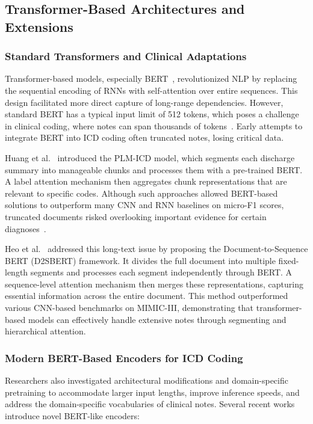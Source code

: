 \subsection{Transformer-Based Architectures and Extensions}\label{sec:p1:transformers}

\subsubsection{Standard Transformers and Clinical Adaptations}

Transformer-based models, especially BERT~\citep{devlin2019bert}, revolutionized NLP by replacing the sequential encoding of RNNs with self-attention over entire sequences. This design facilitated more direct capture of long-range dependencies. However, standard BERT has a typical input limit of 512 tokens, which poses a challenge in clinical coding, where notes can span thousands of tokens~\citep{gao2021limitations}. Early attempts to integrate BERT into ICD coding often truncated notes, losing critical data. 

Huang et al.~\citep{huang2022plm} introduced the PLM-ICD model, which segments each discharge summary into manageable chunks and processes them with a pre-trained BERT. A label attention mechanism then aggregates chunk representations that are relevant to specific codes. Although such approaches allowed BERT-based solutions to outperform many CNN and RNN baselines on micro-F1 scores, truncated documents risked overlooking important evidence for certain diagnoses~\citep{dong2022automated}.

Heo et al.~\citep{heo2022medical} addressed this long-text issue by proposing the Document-to-Sequence BERT (D2SBERT) framework. It divides the full document into multiple fixed-length segments and processes each segment independently through BERT. A sequence-level attention mechanism then merges these representations, capturing essential information across the entire document. This method outperformed various CNN-based benchmarks on MIMIC-III, demonstrating that transformer-based models can effectively handle extensive notes through segmenting and hierarchical attention.

\subsubsection{Modern BERT-Based Encoders for ICD Coding}

Researchers also investigated architectural modifications and domain-specific pretraining to accommodate larger input lengths, improve inference speeds, and address the domain-specific vocabularies of clinical notes. Several recent works introduce novel BERT-like encoders:


